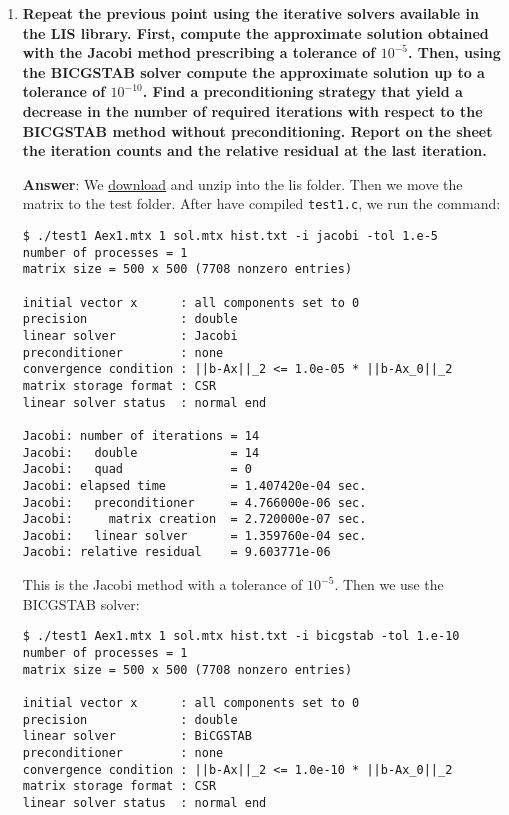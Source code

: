 \begin{enumerate}[label=\textcolor{Green3}{\textbf{\arabic*.}}]
    \newpage

    \item \textcolor{Green3}{\textbf{%
        Repeat the previous point using the iterative solvers available in the LIS library. First, compute the approximate solution obtained with the Jacobi method prescribing a tolerance of $10^{-5}$. Then, using the BICGSTAB solver compute the approximate solution up to a tolerance of $10^{-10}$. Find a preconditioning strategy that yield a decrease in the number of required iterations with respect to the BICGSTAB method without preconditioning. Report on the sheet the iteration counts and the relative residual at the last iteration.
    }}

    \textbf{Answer}: We \href{https://www.ssisc.org/lis/dl/lis-2.1.6.zip}{download} and unzip into the lis folder. Then we move the matrix to the test folder. After have compiled \texttt{test1.c}, we run the command:
    \begin{lstlisting}[mathescape=false]
$ ./test1 Aex1.mtx 1 sol.mtx hist.txt -i jacobi -tol 1.e-5
number of processes = 1
matrix size = 500 x 500 (7708 nonzero entries)

initial vector x      : all components set to 0
precision             : double
linear solver         : Jacobi
preconditioner        : none
convergence condition : ||b-Ax||_2 <= 1.0e-05 * ||b-Ax_0||_2
matrix storage format : CSR
linear solver status  : normal end

Jacobi: number of iterations = 14
Jacobi:   double             = 14
Jacobi:   quad               = 0
Jacobi: elapsed time         = 1.407420e-04 sec.
Jacobi:   preconditioner     = 4.766000e-06 sec.
Jacobi:     matrix creation  = 2.720000e-07 sec.
Jacobi:   linear solver      = 1.359760e-04 sec.
Jacobi: relative residual    = 9.603771e-06\end{lstlisting}
    This is the Jacobi method with a tolerance of $10^{-5}$. Then we use the BICGSTAB solver:
    \begin{lstlisting}[mathescape=false]
$ ./test1 Aex1.mtx 1 sol.mtx hist.txt -i bicgstab -tol 1.e-10
number of processes = 1
matrix size = 500 x 500 (7708 nonzero entries)

initial vector x      : all components set to 0
precision             : double
linear solver         : BiCGSTAB
preconditioner        : none
convergence condition : ||b-Ax||_2 <= 1.0e-10 * ||b-Ax_0||_2
matrix storage format : CSR
linear solver status  : normal end


\end{lstlisting}
\end{enumerate}
